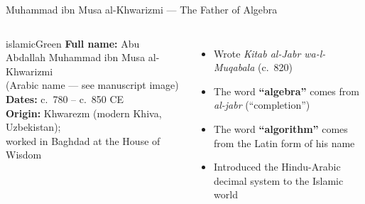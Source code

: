 \begin{frame}[shrink=18]{Muhammad ibn Musa al-Khwarizmi --- The Father of Algebra}
  \begin{columns}[T]
    \begin{personbox}[Al-Khwarizmi]{islamicGreen}
      \textbf{Full name:} Abu Abdallah Muhammad ibn Musa al-Khwarizmi\\
      {\small (Arabic name --- see manuscript image)}\\[3pt]
      \textbf{Dates:} c.\ 780 -- c.\ 850 CE\\
      \textbf{Origin:} Khwarezm (modern Khiva, Uzbekistan);\\
      worked in Baghdad at the House of Wisdom
    \end{personbox}
    \vspace{0.4em}
    \begin{itemize}
      \item Wrote \textit{Kitab al-Jabr wa-l-Muqabala} (c.\ 820)
      \item The word \textbf{``algebra''} comes from \textit{al-jabr} (``completion'')
      \item The word \textbf{``algorithm''} comes from the Latin form of his name
      \item Introduced the Hindu-Arabic decimal system to the Islamic world
    \end{itemize}


    \vspace{0.5em}
  \end{columns}

\end{frame}

